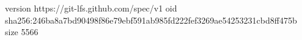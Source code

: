 version https://git-lfs.github.com/spec/v1
oid sha256:246ba8a7bd90498f86e79ebf591ab985fd222fef3269ae54253231cbd8ff475b
size 5566
